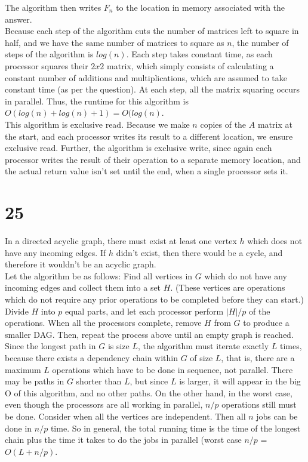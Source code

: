 \documentclass[letterpaper,notitlepage,twoside]{article}
\begin{document}
The algorithm then writes $F_n$ to the location in memory associated with the answer. \\
Because each step of the algorithm cuts the number of matrices left to square in half, and we have the same number of matrices to square as $n$, the number of steps of the algorithm is $log(n)$. Each step takes constant time, as each processor squares their $2x2$ matrix, which simply consists of calculating a constant number of additions and multiplications, which are assumed to take constant time (as per the question). At each step, all the matrix squaring occurs in parallel. Thus, the runtime for this algorithm is $O(log(n) + log(n) + 1) = O(log(n)$. \\
This algorithm is exclusive read. Because we make $n$ copies of the $A$ matrix at the start, and each processor writes its result to a different location, we ensure exclusive read. Further, the algorithm is exclusive write, since again each processor writes the result of their operation to a separate memory location, and the actual return value isn't set until the end, when a single processor sets it. 
\section*{25}
In a directed acyclic graph, there must exist at least one vertex $h$ which does not have any incoming edges. If $h$ didn't exist, then there would be a cycle, and therefore it wouldn't be an acyclic graph. 
\\
Let the algorithm be as follows:
Find all vertices in $G$ which do not have any incoming edges and collect them into a set $H$. (These vertices are operations which do not require any prior operations to be completed before they can start.) Divide $H$ into $p$ equal parts, and let each processor perform $|H|/p$ of the operations. When all the processors complete, remove $H$ from $G$ to produce a smaller DAG. Then, repeat the process above until an empty graph is reached.
\\
Since the longest path in $G$ is size $L$, the algorithm must iterate exactly $L$ times, because there exists a dependency chain within $G$ of size $L$, that is, there are a maximum $L$ operations which have to be done in sequence, not parallel. There may be paths in $G$ shorter than $L$, but since $L$ is larger, it will appear in the big O of this algorithm, and no other paths. On the other hand, in the worst case, even though the processors are all working in parallel, $n/p$ operations still must be done. Consider when all the vertices are independent. Then all $n$ jobs can be done in $n/p$ time. So in general, the total running time is the time of the longest chain plus the time it takes to do the jobs in parallel (worst case $n/p$ = $O(L + n/p)$.
\end{document}
